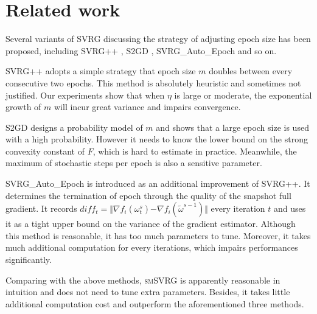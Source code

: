 \documentclass[conference]{IEEEtran}
\begin{document}
\section{Related work}
\label{sectiove_related_work}
Several variants of SVRG  discussing the strategy of adjusting epoch size has been proposed, including SVRG++ \citep{Allen2015Improved}, S2GD \citep{Richtarik:2013te}, SVRG\_Auto\_Epoch \citep{Allen2015Improved} and so on. 

SVRG++ adopts a simple strategy that epoch size $m$ doubles between every consecutive two epochs. This method is absolutely heuristic and sometimes not justified. Our experiments show that when $\eta$ is large or moderate, the exponential growth of $m$ will incur great variance and impairs convergence. 

S2GD designs a probability model of $m$ and shows that a large epoch size is used with a high probability. However it needs to know the lower bound on the strong convexity constant of $F$, which is hard to estimate in practice. Meanwhile, the maximum of stochastic steps per epoch is also a sensitive parameter.

SVRG\_Auto\_Epoch is introduced as an additional improvement of SVRG++. It determines the termination of epoch through the quality of the snapshot full gradient. It records $diff_t = \Vert\nabla f_{i}(\omega_t^s)\mathrm{-}\nabla f_{i}(\tilde{\omega}^{s-1})\Vert$ every iteration $t$ and uses it as a tight upper bound on the variance of the gradient estimator. Although this method is reasonable, it has too much parameters to tune. Moreover, it takes much additional computation for every iterations, which impairs performances significantly. 

Comparing with the above methods, \textsc{smSVRG} is apparently reasonable in intuition and does not need to tune extra parameters. Besides, it takes little additional computation cost and outperform the aforementioned three methods.

\end{document}
